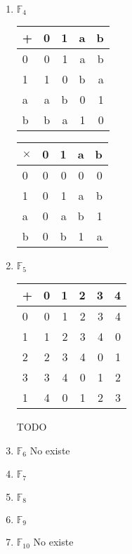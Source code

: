 \begin{solution}
\begin{enumerate}
\item $\mathbb{F}_4$

\begin{center}
  \begin{tabular}{ | l | c | r | r | r |}
    \hline
    + & 0 & 1 & a & b \\ \hline
    0 & 0 & 1 & a & b \\ \hline
    1 & 1 & 0 & b & a \\ \hline
    a & a & b & 0 & 1 \\ \hline
    b & b & a & 1 & 0 \\ \hline
  \end{tabular}
  \quad
  \begin{tabular}{ | l | c | r | r | r |}
    \hline
    $\times$ & 0 & 1 & a & b \\ \hline
    0 & 0 & 0 & 0 & 0 \\ \hline
    1 & 0 & 1 & a & b \\ \hline
    a & 0 & a & b & 1 \\ \hline
    b & 0 & b & 1 & a \\ \hline
  \end{tabular}
\end{center}

\item $\mathbb{F}_5$

\begin{center}
  \begin{tabular}{ | l | c | r | r | r | r |}
    \hline
    + & 0 & 1 & 2 & 3 & 4 \\ \hline
    0 & 0 & 1 & 2 & 3 & 4 \\ \hline
    1 & 1 & 2 & 3 & 4 & 0 \\ \hline
    2 & 2 & 3 & 4 & 0 & 1 \\ \hline
    3 & 3 & 4 & 0 & 1 & 2 \\ \hline
    1 & 4 & 0 & 1 & 2 & 3 \\ \hline
  \end{tabular}
  \quad
  TODO
\end{center}

\item $\mathbb{F}_6$ No existe
\item $\mathbb{F}_7$
\item $\mathbb{F}_8$
\item $\mathbb{F}_9$
\item $\mathbb{F}_{10}$ No existe

\end{enumerate}
\end{solution}
